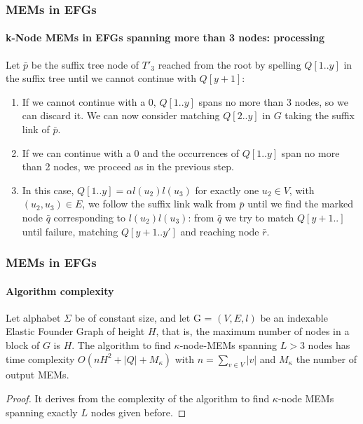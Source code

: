 \begin{frame}
	\frametitle{MEMs in EFGs}
	\framesubtitle{k-Node MEMs in EFGs spanning more than 3 nodes: processing}
	Let \(\bar{p}\) be the suffix tree node of \(T'_3\) reached from the root by spelling
	\(Q[1..y]\) in the suffix tree until we cannot continue with \(Q[y+1]\):
	\begin{enumerate}
		\item If we cannot continue with a \(0\), \(Q[1..y]\) spans no more than 3 nodes, so we can discard
		it. We can now consider matching \(Q[2..y]\) in \(G\) taking the suffix link of \(\bar{p}\).
		\onslide<3-4>\item If we can continue with a \(0\) and the occurrences of \(Q[1..y]\) span no more
		than 2 nodes, we proceed as in the previous step.
		\onslide<4>\item In this case, \(Q[1..y] = \alpha l(u_2)l(u_3)\) for exactly one \(u_2 \in V\),
		with \((u_2, u_3) \in E\), we follow the suffix link walk from \(\bar{p}\) until we find the marked
		node \(\bar{q}\) corresponding to \(l(u_2)l(u_3)\): from \(\bar{q}\) we try to
		match \(Q[y + 1..]\) until failure, matching \(Q[y + 1..y']\) and reaching node \(\bar{r}\).
	\end{enumerate}
\end{frame}

\begin{frame}
	\frametitle{MEMs in EFGs}
	\framesubtitle{Algorithm complexity}
	\begin{theorem}
		Let alphabet \(\Sigma\) be of constant size, and let G = \((V, E, l)\) be an indexable
		Elastic Founder Graph of height \(H\), that is, the maximum number of nodes in a block of
		\(G\) is \(H\).
		The algorithm to find \(\kappa\)-node-MEMs spanning \(L>3\) nodes has time complexity
		\(O(nH^2 + |Q| + M_\kappa)\) with \(n = \sum_{v \in V}|v|\) and \(M_\kappa\) the number
		of output MEMs.
	\end{theorem}
	\begin{proof}
		It derives from the complexity of the algorithm to find \(\kappa\)-node MEMs spanning exactly
		\(L\) nodes given before.
	\end{proof}
\end{frame}